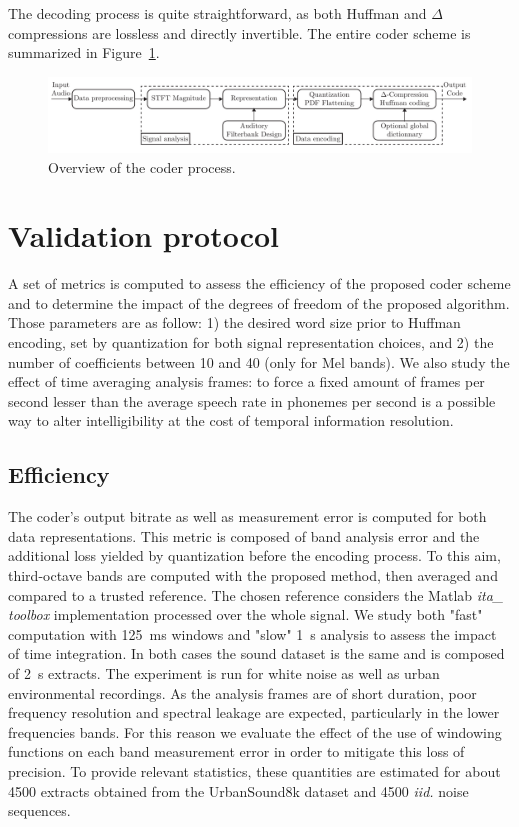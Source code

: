 \documentclass[final,3p,times,twocolumn]{elsarticle}
\begin{document}
The decoding process is quite straightforward, as both Huffman and $\Delta$ compressions are lossless and directly invertible. The entire coder scheme is summarized in Figure~\ref{fig:scheme}.

\begin{figure}[htbp]
	\centering
		\includegraphics[width=1\textwidth]{figures/scheme.pdf}
	\caption{Overview of the coder process.}
	\label{fig:scheme}
\end{figure}

\section{Validation protocol} \label{sec:protocol}

A set of metrics is computed to assess the efficiency of the proposed coder scheme and to determine the impact of the degrees of freedom of the proposed algorithm. Those parameters are as follow: 1) the desired word size prior to Huffman encoding, set by quantization for both signal representation choices, and 2) the number of coefficients between 10 and 40 (only for Mel bands). We also study the effect of time averaging analysis frames: to force a fixed amount of frames per second lesser than the average speech rate in phonemes per second is a possible way to alter intelligibility at the cost of temporal information resolution.

\subsection{Efficiency}

The coder's output bitrate as well as measurement error is computed for both data representations. This metric is composed of band analysis error and the additional loss yielded by quantization before the encoding process. To this aim, third-octave bands are computed with the proposed method, then averaged and compared to a trusted reference. The chosen reference considers the Matlab \textit{ita\_ toolbox} implementation \cite{itatoolbox2017} processed over the whole signal. We study both "fast" computation with 125~ms windows and "slow" 1~s analysis to assess the impact of time integration. In both cases the sound dataset is the same and is composed of 2~s extracts. The experiment is run for white noise as well as urban environmental recordings. As the analysis frames are of short duration, poor frequency resolution and spectral leakage are expected, particularly in the lower frequencies bands. For this reason we evaluate the effect of the use of windowing functions on each band measurement error in order to mitigate this loss of precision. To provide relevant statistics, these quantities are estimated for about 4500 extracts obtained from the UrbanSound8k dataset \cite{salamon2014} and 4500 \textit{iid.} noise sequences.
\end{document}
